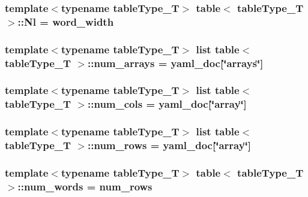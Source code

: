 \label{classtable_a1a42a6604769284e9187575b0abc876d}
\hypertarget{classtable_a2a737b75a5ba5091935134df082e2c39}{
\subsubsection[{Nl}]{\setlength{\rightskip}{0pt plus 5cm}template$<$typename tableType\_\-T$>$ {\bf table}$<$ tableType\_\-T $>$::{\bf Nl} = {\bf word\_\-width}}}
\label{classtable_a2a737b75a5ba5091935134df082e2c39}
\hypertarget{classtable_a14f0e7c4dcb9436645bd912ac804c094}{
\subsubsection[{num\_\-arrays}]{\setlength{\rightskip}{0pt plus 5cm}template$<$typename tableType\_\-T$>$ list {\bf table}$<$ tableType\_\-T $>$::{\bf num\_\-arrays} = {\bf yaml\_\-doc}\mbox{[}\char`\"{}arrays\char`\"{}\mbox{]}}}
\label{classtable_a14f0e7c4dcb9436645bd912ac804c094}
\hypertarget{classtable_a38126dcd841a7cbcb52c1884827b131e}{
\subsubsection[{num\_\-cols}]{\setlength{\rightskip}{0pt plus 5cm}template$<$typename tableType\_\-T$>$ list {\bf table}$<$ tableType\_\-T $>$::{\bf num\_\-cols} = {\bf yaml\_\-doc}\mbox{[}\char`\"{}array\char`\"{}\mbox{]}}}
\label{classtable_a38126dcd841a7cbcb52c1884827b131e}
\hypertarget{classtable_aa31878a72f24f17c2100bc7e9acd96d0}{
\subsubsection[{num\_\-rows}]{\setlength{\rightskip}{0pt plus 5cm}template$<$typename tableType\_\-T$>$ list {\bf table}$<$ tableType\_\-T $>$::{\bf num\_\-rows} = {\bf yaml\_\-doc}\mbox{[}\char`\"{}array\char`\"{}\mbox{]}}}
\label{classtable_aa31878a72f24f17c2100bc7e9acd96d0}
\hypertarget{classtable_a64c900658131e38359a1f39fe0f2d489}{
\subsubsection[{num\_\-words}]{\setlength{\rightskip}{0pt plus 5cm}template$<$typename tableType\_\-T$>$ {\bf table}$<$ tableType\_\-T $>$::{\bf num\_\-words} = {\bf num\_\-rows}}}
